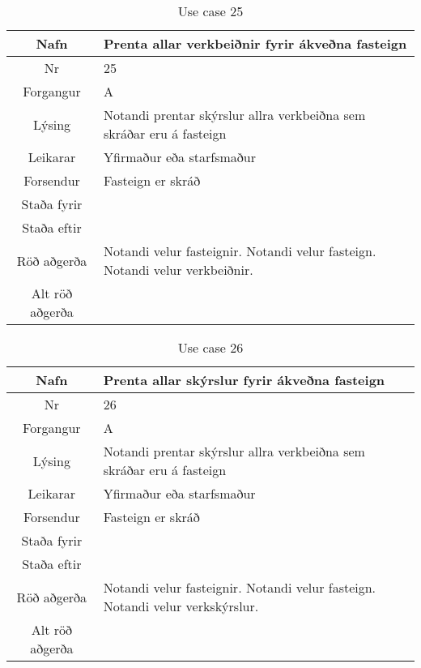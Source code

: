 \begin{table}[h!]\centering
\begin{tabular}{|c|p{10cm}|}
\hline
Nafn&Prenta allar verkbeiðnir fyrir ákveðna fasteign\\
\hline
Nr&25\\
\hline
Forgangur&A\\
\hline
Lýsing&Notandi prentar skýrslur allra verkbeiðna sem skráðar eru á fasteign\\
\hline
Leikarar&Yfirmaður eða starfsmaður\\
\hline
Forsendur&Fasteign er skráð\\
\hline
Staða fyrir&\\
\hline
Staða eftir&\\
\hline
Röð aðgerða&Notandi velur fasteignir. Notandi velur fasteign. Notandi velur verkbeiðnir.\\
\hline
Alt röð aðgerða&\\
\hline
\end{tabular}
\caption{Use case 25}\label{tab:use_case_25}
\end{table}
\begin{table}[h!]\centering
\begin{tabular}{|c|p{10cm}|}
\hline
Nafn&Prenta allar skýrslur fyrir ákveðna fasteign\\
\hline
Nr&26\\
\hline
Forgangur&A\\
\hline
Lýsing&Notandi prentar skýrslur allra verkbeiðna sem skráðar eru á fasteign\\
\hline
Leikarar&Yfirmaður eða starfsmaður\\
\hline
Forsendur&Fasteign er skráð\\
\hline
Staða fyrir&\\
\hline
Staða eftir&\\
\hline
Röð aðgerða&Notandi velur fasteignir. Notandi velur fasteign. Notandi velur verkskýrslur.\\
\hline
Alt röð aðgerða&\\
\hline
\end{tabular}
\caption{Use case 26}\label{tab:use_case_26}
\end{table}
